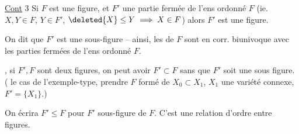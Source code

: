 \uline{Cont} 3 Si $F$ est une  figure, et $F'$ une partie fermée de l'ens ordonné $F$ (ie. $X,Y\in F$, $Y\in F'$, $\deleted{X}\leq Y\implies X\in F$) alors $F'$ est une figure.

On dit que $F'$ est une sous-figure -- ainsi, les  de $F$ sont en corr. biunivoque avec les parties fermées de l'ens ordonné $F$.

, si $F',F$ sont deux figures, on peut avoir $F'\subset F$ sans que $F'$ soit une sous figure. ( le cas de l'exemple-type, prendre $F$ formé de $X_0\subset X_1$, $X_1$ une variété connexe, $F'=\{X_1\}$.)


On écrira \deleted{$\unsure{\leq|\subset}$} $F'\leq F$ pour $F'$ sous-figure de $F$. C'est une relation d'ordre entre figures.

